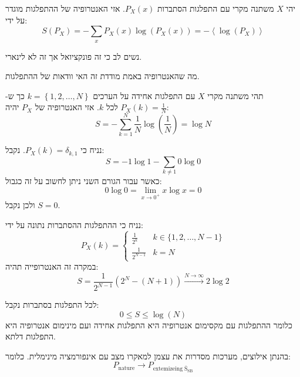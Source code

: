 \documentclass{tstextbook}
\begin{document}
\begin{definition}
יהי \(X\) משתנה מקרי עם התפלגות הסתברות \(P_{X}(x)\). אזי האנטרופיה של ההתפלגות מוגדר על ידי:
$$S(P_{X})=-\sum_{x}P_{X}\left(x\right)\log\left(P_{X}\left(x\right)\right)=-\left\langle\log\left(P_{X}\right)\right\rangle$$

\end{definition}
\begin{remark}
נשים לב כי זה פונקציואל אך זה לא לינארי.

\end{remark}
\begin{remark}
מה שהאנטרופיה באמת מודדת זה האי וודאות של ההתפלגות.

\end{remark}
\begin{example}
תהי משתנה מקרי \(X\) עם התפלגות אחידה על הערכים \(k=\left\{  1,2,\dots,N  \right\}\) כך ש-\(P_{X}(k)=\frac{1}{N}\) לכל \(k\). אזי האנטרופיה של \(P_{X}\) יהיה:
$$S=-\sum_{k=1}^{N} \frac{1}{N}\log\left( \frac{1}{N} \right)=\log N$$

\end{example}
\begin{example}
נניח כי \(P_{X}(k)=\delta_{k,1}\). נקבל:
$$S=-1\log 1 - \sum_{k\neq 1} 0 \log 0$$
כאשר עבור הגורם השני ניתן לחשוב על זה כגבול:
$$0\log 0 = \lim_{ x \to 0^{+} } x\log x=0$$
ולכן נקבל \(S=0\).

\end{example}
\begin{example}
נניח כי ההתפלגות ההסתברות נתונה על ידי:
$$P_{X}\left(k\right)=\begin{cases}\frac{1}{2^{k}} & k \in \{ 1,2,\dots,N-1 \} \\\frac{1}{2^{N-1}} & k=N
\end{cases}$$
במקרה זה האנטרופייה תהיה:
$$S=\frac{1}{2^{N-1}}(2^{N}-(N+1))\xrightarrow{N\to \infty}2\log 2$$

\end{example}
\begin{proposition}
לכל התפלגות בסתברות נקבל:
$$0\leq S\leq  \log(N)$$
כלומר ההתפלגות עם מקסימום אנטרופיה היא התפלגות אחידה ועם מינימום אנטרופיה היא התפלגות דלתא.

\end{proposition}
\begin{theorem}
בהנתן אילוצים, מערכות מסדרות את עצמן למאקרו מצב עם אינפורמציה מינימלית. כלומר:
$$P_{\text{nature}}\to P_{\mathrm{extemizeing \;\overline{S}_{SB} }}$$

\end{theorem}
\end{document}
